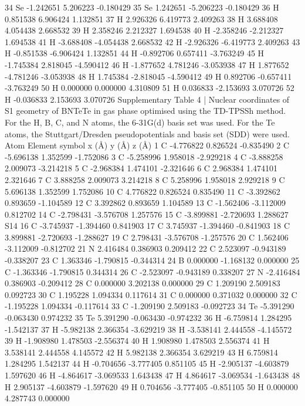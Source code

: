 34 Se -1.242651 5.206223 -0.180429
35 Se 1.242651 -5.206223 -0.180429
36 H 0.851538 6.906424 1.132851
37 H 2.926326 6.419773 2.409263
38 H 3.688408 4.054438 2.668532
39 H 2.358246 2.212327 1.694538
40 H -2.358246 -2.212327 1.694538
41 H -3.688408 -4.054438 2.668532
42 H -2.926326 -6.419773 2.409263
43 H -0.851538 -6.906424 1.132851
44 H -0.892706 0.657411 -3.763249
45 H -1.745384 2.818045 -4.590412
46 H -1.877652 4.781246 -3.053938
47 H 1.877652 -4.781246 -3.053938
48 H 1.745384 -2.818045 -4.590412
49 H 0.892706 -0.657411 -3.763249
50 H 0.000000 0.000000 4.310809
51 H 0.036833 -2.153693 3.070726
52 H -0.036833 2.153693 3.070726
Supplementary Table 4 | Nuclear coordinates of S1 geometry of BNTeTe in gas phase
optimised using the TD-TPSSh method. For the H, B, C, and N atoms, the 6-31G(d) basis set
was used. For the Te atoms, the Stuttgart/Dresden pseudopotentials and basis set (SDD) were
used.
Atom Element symbol x (Å) y (Å) z (Å)
1 C -4.776822 0.826524 -0.835490
2 C -5.696138 1.352599 -1.752086
3 C -5.258996 1.958018 -2.929218
4 C -3.888258 2.009073 -3.214218
5 C -2.968384 1.474101 -2.321646
6 C 2.968384 1.474101 2.321646
7 C 3.888258 2.009073 3.214218
8 C 5.258996 1.958018 2.929218
9 C 5.696138 1.352599 1.752086
10 C 4.776822 0.826524 0.835490
11 C -3.392862 0.893659 -1.104589
12 C 3.392862 0.893659 1.104589
13 C -1.562406 -3.112009 0.812702
14 C -2.798431 -3.576708 1.257576
15 C -3.899881 -2.720693 1.288627
S14
16 C -3.745937 -1.394460 0.841903
17 C 3.745937 -1.394460 -0.841903
18 C 3.899881 -2.720693 -1.288627
19 C 2.798431 -3.576708 -1.257576
20 C 1.562406 -3.112009 -0.812702
21 N 2.416484 0.386903 0.209412
22 C 2.523097 -0.943189 -0.338207
23 C 1.363346 -1.790815 -0.344314
24 B 0.000000 -1.168132 0.000000
25 C -1.363346 -1.790815 0.344314
26 C -2.523097 -0.943189 0.338207
27 N -2.416484 0.386903 -0.209412
28 C 0.000000 3.202138 0.000000
29 C 1.209190 2.509183 0.092723
30 C 1.195228 1.094334 0.117614
31 C 0.000000 0.371032 0.000000
32 C -1.195228 1.094334 -0.117614
33 C -1.209190 2.509183 -0.092723
34 Te -5.391290 -0.063430 0.974232
35 Te 5.391290 -0.063430 -0.974232
36 H -6.759814 1.284295 -1.542137
37 H -5.982138 2.366354 -3.629219
38 H -3.538141 2.444558 -4.145572
39 H -1.908980 1.478503 -2.556374
40 H 1.908980 1.478503 2.556374
41 H 3.538141 2.444558 4.145572
42 H 5.982138 2.366354 3.629219
43 H 6.759814 1.284295 1.542137
44 H -0.704656 -3.777405 0.851105
45 H -2.905137 -4.603879 1.597620
46 H -4.864617 -3.069533 1.643438
47 H 4.864617 -3.069534 -1.643438
48 H 2.905137 -4.603879 -1.597620
49 H 0.704656 -3.777405 -0.851105
50 H 0.000000 4.287743 0.000000
